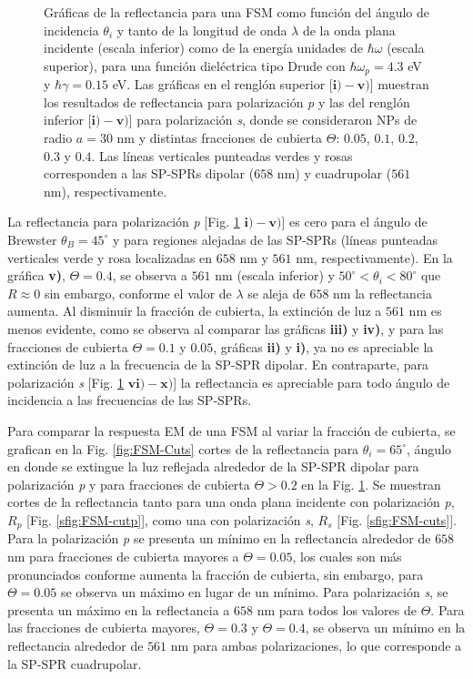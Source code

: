 \begin{figure}[h!]
\begin{tikzpicture}
\end{tikzpicture}\vspace*{-.5em}
	\caption{Gráficas de la reflectancia para una FSM como función del ángulo de incidencia $\theta_i$ y tanto de la longitud de onda $\lambda$ de la onda plana incidente (escala inferior) como de la energía  unidades de $\hbar\omega$ (escala superior), para una función dieléctrica tipo Drude con $\hbar\omega_p=4. 3$ eV  y  $\hbar\gamma=0. 15$ eV.  Las gráficas   en el renglón superior [$\mathbf{i)-v)}$]  muestran los resultados de reflectancia para  polarización \emph{p} y las del renglón inferior  [$\mathbf{i)-v)}$] para polarización  \emph{s}, donde se consideraron NPs de radio $a=30$ nm y distintas fracciones de cubierta $\Theta$: $0. 05$, $0. 1$, $0. 2$, $0. 3$ y $0. 4$. Las líneas verticales punteadas verdes y rosas corresponden a las SP-SPRs dipolar ($658$ nm) y cuadrupolar ($561$ nm), respectivamente.}	\label{fig:R-FSM}	
	\end{figure}		
					
La reflectancia para polarización \emph{p} [Fig. \ref{fig:R-FSM} $\mathbf{i)-v)}$] es cero para el ángulo de Brewster $\theta_B = 45^\circ$ y para regiones alejadas de las SP-SPRs (líneas punteadas verticales verde y rosa  localizadas en $658$ nm y $561$ nm, respectivamente). En la gráfica \textbf{v)}, $\Theta=0.4$,  se observa a $561$ nm (escala inferior) y $50^\circ<\theta_i<80^\circ$ que $R\approx 0$ sin embargo, conforme el valor de $\lambda$ se aleja de $658$ nm la reflectancia aumenta. Al disminuir la fracción de cubierta, la extinción de luz a $561$ nm  es menos evidente, como se observa al comparar las gráficas \textbf{iii)} y \textbf{iv)}, y para las fracciones de cubierta $\Theta=0.1$ y $0.05$, gráficas \textbf{ii)} y \textbf{i)}, ya no es apreciable la extinción de luz a la frecuencia de la SP-SPR dipolar. En contraparte, para polarización \emph{s} [Fig. \ref{fig:R-FSM} $\mathbf{vi)-x)}$] la reflectancia es apreciable para todo ángulo de incidencia a las frecuencias de las SP-SPRs. 

Para comparar la respuesta EM  de una FSM al variar la fracción de cubierta, se grafican en la  Fig. \ref{fig:FSM-Cuts} cortes de la reflectancia para $\theta_i = 65^\circ$, ángulo en donde se extingue la luz reflejada alrededor de la SP-SPR dipolar para polarización \emph{p} y para fracciones de cubierta $\Theta>0.2$ en la Fig. \ref{fig:R-FSM}. Se muestran cortes de la reflectancia tanto para una onda plana incidente con polarización \emph{p}, $R_p$ [Fig. \ref{sfig:FSM-cutp}], como una con polarización \emph{s}, $R_s$ [Fig. \ref{sfig:FSM-cuts}]. Para la polarización \emph{p} se presenta un mínimo en la reflectancia alrededor de $658$ nm para fracciones de cubierta mayores a $\Theta = 0.05$, los cuales son más pronunciados conforme aumenta la fracción de cubierta, sin embargo, para $\Theta=0.05$ se observa un máximo en lugar de un mínimo. Para polarización \emph{s}, se presenta un máximo en la reflectancia a $658$ nm para todos los valores de $\Theta$. Para las fracciones de cubierta mayores, $\Theta = 0.3$ y $\Theta = 0.4$,  se observa un  mínimo en la reflectancia alrededor de $561$ nm para ambas polarizaciones, lo que corresponde a la SP-SPR cuadrupolar.

